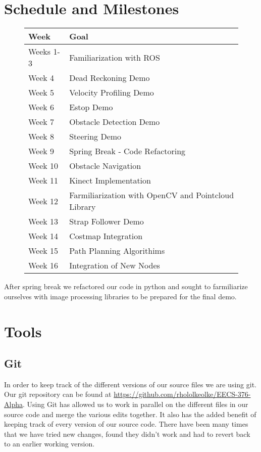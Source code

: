 
\newpage
\section{Schedule and Milestones}

\FloatBarrier
\begin{figure}[h]
\begin{longtable}{|l|l|}
  \hline {\bf Week} & {\bf Goal} \\ \hline
Weeks 1-3 & Familiarization with ROS \\ \hline
Week 4 & Dead Reckoning Demo \\ \hline
Week 5 & Velocity Profiling Demo \\ \hline
Week 6 & Estop Demo \\ \hline
Week 7 & Obstacle Detection Demo \\ \hline
Week 8 & Steering Demo \\ \hline
Week 9 & Spring Break - Code Refactoring \\ \hline
Week 10 & Obstacle Navigation \\ \hline
Week 11 & Kinect Implementation \\ \hline
Week 12 & Farmiliarization with OpenCV and Pointcloud Library \\ \hline
Week 13 & Strap Follower Demo \\ \hline
Week 14 & Costmap Integration \\ \hline
Week 15 & Path Planning Algorithims \\ \hline
Week 16 & Integration of New Nodes \\ \hline
\end{longtable}
\end{figure}
\FloatBarrier

After spring break we refactored our code in python and sought to farmiliarize ourselves with image processing libraries to be prepared for the final demo.

\section{Tools}

\subsection{Git}

In order to keep track of the different versions of our source files
we are using git.  Our git repository can be found at
\url{https://github.com/rhololkeolke/EECS-376-Alpha}.  Using Git has
allowed us to work in parallel on the different files in our source
code and merge the various edits together.  It also has the added
benefit of keeping track of every version of our source code. There
have been many times that we have tried new changes, found they didn't
work and had to revert back to an earlier working version.

